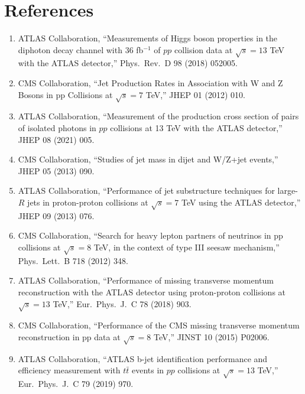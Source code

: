 \documentclass{article}
\begin{document}
\clearpage
\section*{References}

\begin{enumerate}
    \item ATLAS Collaboration, ``Measurements of Higgs boson properties in the diphoton decay channel with 36 fb$^{-1}$ of $pp$ collision data at $\sqrt{s} = 13$ TeV with the ATLAS detector,'' Phys.\ Rev.\ D 98 (2018) 052005.
    
    \item CMS Collaboration, ``Jet Production Rates in Association with W and Z Bosons in pp Collisions at $\sqrt{s} = 7$ TeV,'' JHEP 01 (2012) 010.
    
    \item ATLAS Collaboration, ``Measurement of the production cross section of pairs of isolated photons in $pp$ collisions at 13 TeV with the ATLAS detector,'' JHEP 08 (2021) 005.
    
    \item CMS Collaboration, ``Studies of jet mass in dijet and W/Z+jet events,'' JHEP 05 (2013) 090.
    
    \item ATLAS Collaboration, ``Performance of jet substructure techniques for large-$R$ jets in proton-proton collisions at $\sqrt{s} = 7$ TeV using the ATLAS detector,'' JHEP 09 (2013) 076.
    
    \item CMS Collaboration, ``Search for heavy lepton partners of neutrinos in pp collisions at $\sqrt{s}=8$ TeV, in the context of type III seesaw mechanism,'' Phys.\ Lett.\ B 718 (2012) 348.
    
    \item ATLAS Collaboration, ``Performance of missing transverse momentum reconstruction with the ATLAS detector using proton-proton collisions at $\sqrt{s} = 13$ TeV,'' Eur.\ Phys.\ J.\ C 78 (2018) 903.
    
    \item CMS Collaboration, ``Performance of the CMS missing transverse momentum reconstruction in pp data at $\sqrt{s} = 8$ TeV,'' JINST 10 (2015) P02006.
    
    \item ATLAS Collaboration, ``ATLAS b-jet identification performance and efficiency measurement with $t\bar{t}$ events in $pp$ collisions at $\sqrt{s} = 13$ TeV,'' Eur.\ Phys.\ J.\ C 79 (2019) 970.
    

\end{enumerate}
\end{document}
